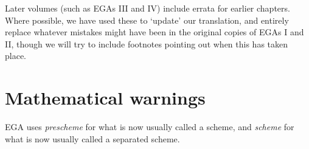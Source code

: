 \sectionbreak

Later volumes (such as EGAs III and IV) include errata for earlier chapters.
Where possible, we have used these to `update' our translation, and entirely replace whatever mistakes might have been in the original copies of EGAs I and II, though we will try to include footnotes pointing out when this has taken place.

\section*{Mathematical warnings}
EGA uses \emph{prescheme} for what is now usually called a scheme, and \emph{scheme} for what is now usually called a separated scheme.

\nocite{*}




